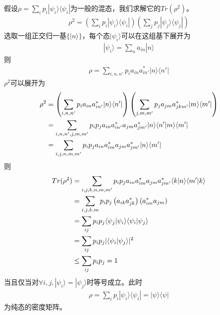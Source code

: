 \documentclass[UTF8,12pt]{article} %
\makeatletter
\newenvironment{proof}[1][\protect\proofname]{\par
\normalfont\topsep6\p@\@plus6\p@\relax
\trivlist
\itemindent\parindent
\item[\hskip\labelsep
\scshape
#1]\ignorespaces
}{%
\endtrivlist\@endpefalse
}
\renewcommand{\proofname}{\it{Solution}}
\makeatother
\begin{document}
\begin{proof}[解]
假设$\rho = \sum_{i}p_i|\psi_i\rangle\langle\psi_i|$为一般的混态，我们求解它的$Tr(\rho^2)$。
\begin{align}
\rho^2 = \left(\sum_{i}p_i|\psi_i\rangle\langle\psi_i|\right)\left(\sum_{j}p_j|\psi_j\rangle\langle\psi_j|\right)
\end{align}
选取一组正交归一基$\{|n\rangle\}$，每个态$|\psi_i\rangle$可以在这组基下展开为
\begin{align}
|\psi_i\rangle = \sum_n a_{in}|n\rangle
\end{align}
则
\begin{align}
\rho = \sum_{i,n,n'} p_i a_{in} a^*_{in'} |n\rangle\langle n'|
\end{align}
$\rho^2$可以展开为
\begin{align}
\rho^2 &= \left(\sum_{i,n,n'} p_i a_{in} a^*_{in'} |n\rangle\langle n'|\right)\left(\sum_{j,m,m'} p_j a_{jm} a^*_{jkm'} |m\rangle\langle m'|\right) \notag\\
&= \sum_{i,n,n',j,m,m'} p_i p_j a_{in} a^*_{in'} a_{jm} a^*_{jm'} |n\rangle\langle n'|m\rangle\langle m'| \notag\\
&= \sum_{i,j,n,m,m'} p_i p_j a_{in} a^*_{im} a_{jm} a^*_{jm'} |n\rangle\langle m'|
\end{align}
则
\begin{align}
Tr(\rho^2) &= \sum_{i,j,k,n,m,m'} p_i p_j a_{in} a^*_{im} a_{jm} a^*_{jm'} \langle k|n\rangle\langle m'|k\rangle \notag\\
&= \sum_{i,j,k,m} p_i p_j \left(a_{ik} a^*_{jk}\right) \left(a^*_{im} a_{jm}\right)  \notag\\
&= \sum_{ij}p_ip_j \langle\psi_j|\psi_i\rangle\langle\psi_i|\psi_j\rangle \notag\\
&= \sum_{ij}p_ip_j |\langle\psi_i|\psi_j\rangle|^2 \\
&\le \sum_{ij}p_ip_j = 1
\end{align}
当且仅当对$\forall i,j,|\psi_i\rangle = |\psi_j\rangle$时等号成立。此时
\begin{align}
\rho = \sum_{i}p_i|\psi_i\rangle\langle\psi_i| = |\psi\rangle\langle\psi|
\end{align}
为纯态的密度矩阵。
\end{proof}
\end{document}
